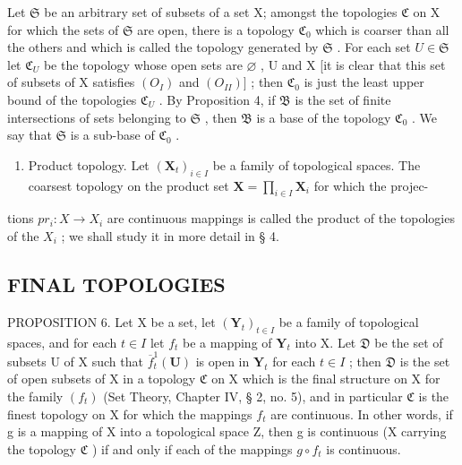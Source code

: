 Let \(\mathfrak{S}\) be an arbitrary set of subsets of a set X; amongst the topologies \(\mathfrak{C}\) on X for which the sets of \(\mathfrak{S}\) are open, there is a topology \(\mathfrak{C}_0\) which is coarser than all the others and which is called the topology generated by \(\mathfrak{S}\) . For each set \(U \in \mathfrak{S}\) let \(\mathfrak{C}_U\) be the topology whose open sets are \(\varnothing\) , U and X {[}it is clear that this set of subsets of X satisfies \((O_I)\) and \((O_{II})]\) ; then \(\mathfrak{C}_0\) is just the least upper bound of the topologies \(\mathfrak{C}_U\) . By Proposition 4, if \(\mathfrak{B}\) is the set of finite intersections of sets belonging to \(\mathfrak{S}\) , then \(\mathfrak{B}\) is a base of the topology \(\mathfrak{C}_0\) . We say that \(\mathfrak{S}\) is a sub-base of \(\mathfrak{C}_0\) .

\begin{enumerate}
\def\labelenumi{\arabic{enumi})}
\setcounter{enumi}{2}
\tightlist
\item
  Product topology. Let \((\mathbf{X}_t)_{i \in I}\) be a family of topological spaces. The coarsest topology on the product set \(\mathbf{X} = \prod_{i \in I} \mathbf{X}_i\) for which the projec-
\end{enumerate}

tions \(pr_{i}: X \rightarrow X_{i}\) are continuous mappings is called the product of the topologies of the \(X_{i}\) ; we shall study it in more detail in § 4.

\subsection{FINAL TOPOLOGIES}

PROPOSITION 6. Let X be a set, let \((\mathbf{Y}_t)_{t \in I}\) be a family of topological spaces, and for each \(t \in I\) let \(f_t\) be a mapping of \(\mathbf{Y}_t\) into X. Let \(\mathfrak{D}\) be the set of subsets U of X such that \(\overline{f}_t^1(\mathbf{U})\) is open in \(\mathbf{Y}_t\) for each \(t \in I\) ; then \(\mathfrak{D}\) is the set of open subsets of X in a topology \(\mathfrak{C}\) on X which is the final structure on X for the family \((f_t)\) (Set Theory, Chapter IV, § 2, no. 5), and in particular \(\mathfrak{C}\) is the finest topology on X for which the mappings \(f_t\) are continuous. In other words, if g is a mapping of X into a topological space Z, then g is continuous (X carrying the topology \(\mathfrak{C}\) ) if and only if each of the mappings \(g \circ f_t\) is continuous.


